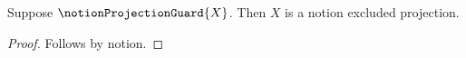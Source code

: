

\begin{proposition}\label{notion_projection_excluded_negative}
    Suppose $\notionProjectionGuard{X}$.
    Then $X$ is a notion excluded projection.
\end{proposition}
\begin{proof}
    Follows by notion.
\end{proof}

